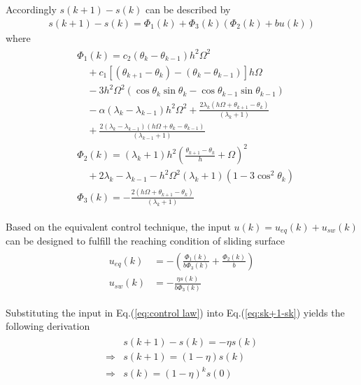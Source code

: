 \documentclass[10pt,onecolumn,draftcls]{IEEEtran}
\begin{document}
	Accordingly $s(k+1)-s(k)$ can be described by 
	\begin{align} \label{eq:sk+1-sk}
		s(k+1)-s(k)=\Phi_1(k)+\Phi_3(k)(\Phi_2(k)+bu(k))
	\end{align}
	where 
	\begin{align}\begin{split}
		&\Phi_1(k)
				=c_2(\theta_k-\theta_{k-1})h^2\Omega^2\\
				&\quad+c_1[(\theta_{k+1}-\theta_k)-(\theta_{k}-\theta_{k-1})]h\Omega\\
                &\quad-3h^2\Omega^2(\cos\theta_k\sin\theta_k-\cos\theta_{k-1}\sin\theta_{k-1})\\
				&\quad-\alpha(\lambda_k-\lambda_{k-1})h^2\Omega^2+\frac{2\lambda_k(h\Omega+\theta_{k+1}-\theta_{k})}{(\lambda_{k}+1)}\\
				&\quad+\frac{2(\lambda_k-\lambda_{k-1})(h\Omega+\theta_k-\theta_{k-1})}{(\lambda_{k-1}+1)}\\
				&\Phi_2(k)=(\lambda_k+1)h^2\left(\frac{\theta_{k+1}-\theta_{k}}{h}+\Omega\right)^2\\
				&\quad+2\lambda_k-\lambda_{k-1}-h^2\Omega^2(\lambda_k+1)(1-3\cos^2\theta_{k})\\
				&\Phi_3(k)=-\frac{2(h\Omega+\theta_{k+1}-\theta_{k})}{(\lambda_{k}+1)}
	\end{split}\end{align}

	Based on the equivalent control technique, the input $u(k)=u_{eq}(k)+u_{sw}(k)$ can be designed to fulfill the reaching condition of sliding surface
	\begin{align}\begin{split}\label{eq:control law}
		u_{eq}(k) &= -\left(\frac{\Phi_1(k)}{b\Phi_3(k)}+\frac{\Phi_2(k)}{b}\right)\\
		u_{sw}(k) &= -\frac{\eta s(k)}{b\Phi_3(k)}
	\end{split}\end{align}
	
	Substituting the input in Eq.(\ref{eq:control law}) into Eq.(\ref{eq:sk+1-sk}) yields the following derivation 
	\begin{align}\begin{split}\label{eq:s(k+1)-s(k) s}
		&s(k+1)-s(k) = -\eta s(k)\\
		\Rightarrow &s(k+1)=(1-\eta)s(k)\\
		\Rightarrow &s(k)=(1-\eta)^ks(0)
	\end{split}\end{align}
\end{document}
